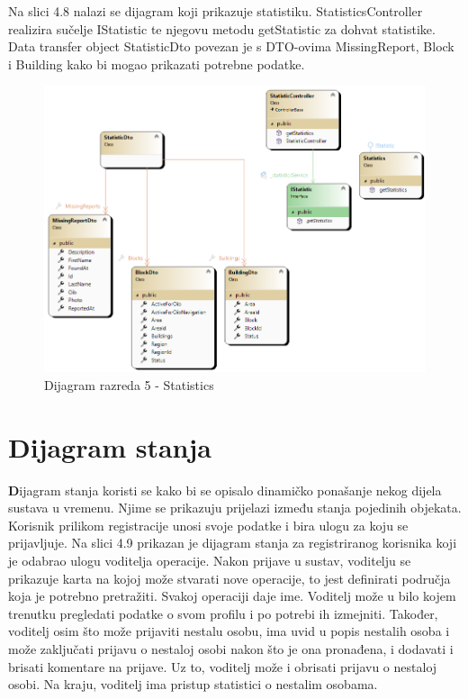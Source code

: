 		\eject
		
		Na slici 4.8 nalazi se dijagram koji prikazuje statistiku. StatisticsController realizira sučelje IStatistic te njegovu metodu getStatistic za dohvat statistike. Data transfer object StatisticDto povezan je s DTO-ovima MissingReport, Block i Building kako bi mogao prikazati potrebne podatke.
		
			\begin{figure}[h!] \includegraphics[width=\linewidth]{dijagrami/CD-Statistics.png}
				\caption{Dijagram razreda 5 - Statistics}
			\end{figure}
					
		\eject
		
		\section{Dijagram stanja}
			
			
			
			
			\textbf Dijagram stanja koristi se kako bi se opisalo dinamičko ponašanje nekog dijela sustava u vremenu. Njime se prikazuju prijelazi između stanja pojedinih objekata. Korisnik prilikom registracije unosi svoje podatke i bira ulogu za koju se prijavljuje. Na slici 4.9 prikazan je dijagram stanja za registriranog korisnika koji je odabrao ulogu voditelja operacije. Nakon prijave u sustav, voditelju se prikazuje karta na kojoj može stvarati nove operacije, to jest definirati područja koja je potrebno pretražiti. Svakoj operaciji daje ime. Voditelj može u bilo kojem trenutku pregledati podatke o svom profilu i po potrebi ih izmejniti. Također, voditelj osim što može prijaviti nestalu osobu, ima uvid u popis nestalih osoba i može zaključati prijavu o nestaloj osobi nakon što je ona pronađena, i dodavati i brisati komentare na prijave. Uz to, voditelj može i obrisati prijavu o nestaloj osobi. Na kraju, voditelj ima pristup statistici o nestalim osobama.   
			
